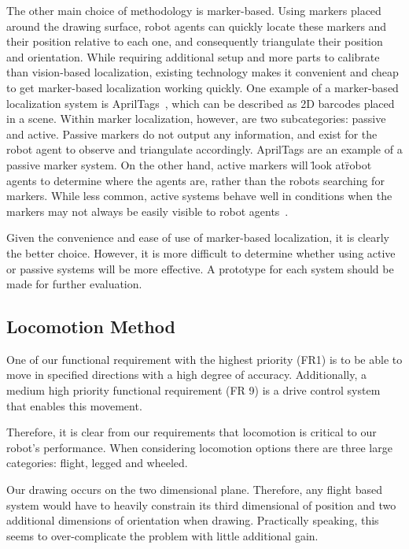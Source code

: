 The other main choice of methodology is marker-based. Using markers placed around the drawing surface, robot agents can quickly locate these markers and their position relative to each one, and consequently triangulate their position and orientation. While requiring additional setup and more parts to calibrate than vision-based localization, existing technology makes it convenient and cheap to get marker-based localization working quickly. One example of a marker-based localization system is AprilTags~\cite{olson2011apriltag}, which can be described as 2D barcodes placed in a scene. Within marker localization, however, are two subcategories: passive and active. Passive markers do not output any information, and exist for the robot agent to observe and triangulate accordingly. AprilTags are an example of a passive marker system. On the other hand, active markers will \"look at\" robot agents to determine where the agents are, rather than the robots searching for markers. While less common, active systems behave well in conditions when the markers may not always be easily visible to robot agents~\cite{cassinis2005active}.

Given the convenience and ease of use of marker-based localization, it is clearly the better choice. However, it is more difficult to determine whether using active or passive systems will be more effective. A prototype for each system should be made for further evaluation.

\subsection{Locomotion Method}
\label{sec:trade_locomotion}
One of our functional requirement with the highest priority (FR1) is to be able to move in specified directions with a high degree of accuracy.  Additionally, a medium high priority functional requirement (FR 9) is a drive control system that enables this movement. 

Therefore, it is clear from our requirements that locomotion is critical to our robot's performance. When considering locomotion options there are three large categories: flight, legged and wheeled. 

Our drawing occurs on the two dimensional plane. Therefore, any flight based system would have to heavily constrain its third dimensional of position and two additional dimensions of orientation when drawing. Practically speaking, this seems to over-complicate the problem with little additional gain. 

